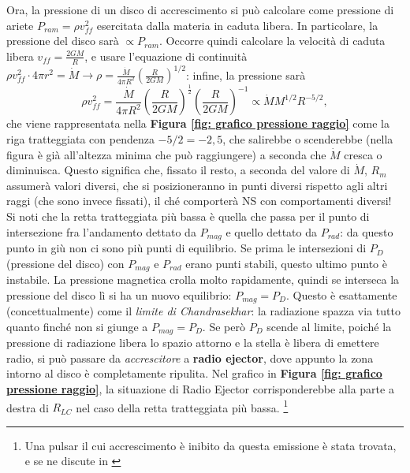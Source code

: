 Ora, la pressione di un disco di accrescimento si può calcolare come pressione di ariete $P_{ram} = \rho v_{ff}^2$ esercitata dalla materia in caduta libera.
In particolare, la pressione del disco sarà $\propto P_{ram}$.
Occorre quindi calcolare la velocità di caduta libera $v_{ff} = \frac{2GM}{R}$, e usare l'equazione di continuità $\rho v_{ff}^2 \cdot4\pi r^2 = \dot{M} \xrightarrow{} \rho = \frac{\dot{M}}{4\pi R^2} \left(\frac{R}{2GM}\right)^{1/2} $: infine, la pressione sarà
\begin{equation}
    \rho v_{ff}^2 = \frac{\dot{M}}{4\pi R^2}\left( \frac{R}{2GM} \right)^{\frac{1}{2}}\left( \frac{R}{2GM} \right)^{-1} \propto \dot{M}M^{1/2}R^{-5/2},
\end{equation}
che viene rappresentata nella \textbf{Figura \ref{fig: grafico pressione raggio}} come la riga tratteggiata con pendenza $-5/2 = -2,5$, che salirebbe o scenderebbe (nella figura è già all'altezza minima che può raggiungere) a seconda che $\dot{M}$ cresca o diminuisca.
Questo significa che, fissato il resto, a seconda del valore di $\dot{M}$, $R_m$ assumerà valori diversi, che si posizioneranno in punti diversi rispetto agli altri raggi (che sono invece fissati), il ché comporterà NS con comportamenti diversi!
Si noti che la retta tratteggiata più bassa è quella che passa per il punto di intersezione fra l'andamento dettato da $P_{mag}$ e quello dettato da $P_{rad}$: da questo punto in giù non ci sono più punti di equilibrio.
Se prima le intersezioni di $P_D$ (pressione del disco) con $P_{mag}$ e $P_{rad} $ erano punti stabili, questo ultimo punto è instabile.
La pressione magnetica crolla molto rapidamente, quindi se interseca la pressione del disco lì si ha un nuovo equilibrio: $P_{mag} = P_D$. 
Questo è esattamente (concettualmente) come il \textit{limite di Chandrasekhar}: la radiazione spazza via tutto quanto finché non si giunge a $P_{mag} = P_D$. 
Se però $P_D$ scende al limite, poiché la pressione di radiazione libera lo spazio attorno e la stella è libera di emettere radio, si può passare da \textit{accrescitore} a \textbf{radio ejector}, dove appunto la zona intorno al disco è completamente ripulita.
Nel grafico in \textbf{Figura \ref{fig: grafico pressione raggio}}, la situazione di Radio Ejector corrisponderebbe alla parte a destra di $R_{LC}$ nel caso della retta tratteggiata più bassa.
\footnote{Una pulsar il cui accrescimento è inibito da questa emissione è stata trovata, e se ne discute in \cite{Burderi_2002}}

